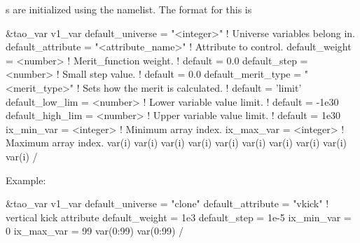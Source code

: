 {{s are initialized using the  namelist. The
format for this is
\begin{example}
  &tao_var
    v1_var%
    default_universe   = "<integer>"         ! Universe variables belong in.
    default_attribute  = "<attribute_name>"  ! Attribute to control.
    default_weight     = <number>            ! Merit_function weight.
                                             ! default = 0.0
    default_step       = <number>            ! Small step value.
                                             ! default = 0.0
    default_merit_type = "<merit_type>"      ! Sets how the merit is calculated.
                                             ! default = 'limit'
    default_low_lim    = <number>            ! Lower variable value limit. 
                                             ! default = -1e30
    default_high_lim   = <number>            ! Upper variable value limit. 
                                             ! default =  1e30
    ix_min_var         = <integer>           ! Minimum array index.
    ix_max_var         = <integer>           ! Maximum array index.
    var(i)%
    var(i)%
    var(i)%
    var(i)%
    var(i)%
    var(i)%
    var(i)%
    var(i)%
    var(i)%
    var(i)%
  /
\end{example}
Example:
\begin{example}
  &tao_var
    v1_var%
    default_universe  = "clone"
    default_attribute = "vkick"     ! vertical kick attribute
    default_weight    = 1e3
    default_step      = 1e-5
    ix_min_var        = 0
    ix_max_var        = 99
    var(0:99)%
    var(0:99)%
  /
\end{example}

}}
